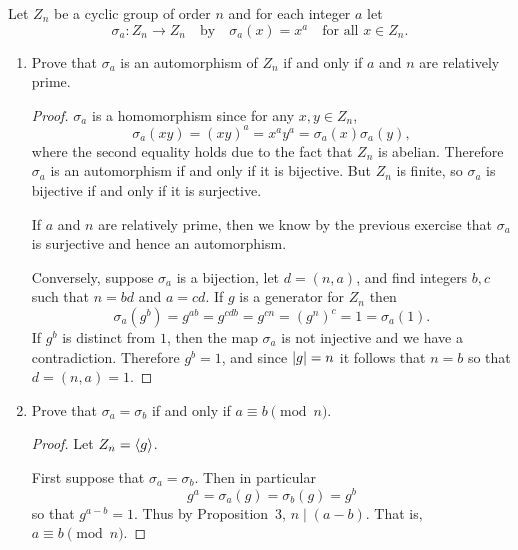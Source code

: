  Let $Z_n$ be a cyclic group of order $n$ and for each
integer $a$ let
\begin{equation*}
  \sigma_a\colon Z_n\to Z_n
  \quad\text{by}\quad
  \sigma_a(x) = x^a \quad\text{for all $x\in Z_n$}.
\end{equation*}
\begin{enumerate}
\item Prove that $\sigma_a$ is an automorphism of $Z_n$ if and only if
  $a$ and $n$ are relatively prime.
  \begin{proof}
    $\sigma_a$ is a homomorphism since for any $x,y\in Z_n$,
    \begin{equation*}
      \sigma_a(xy) = (xy)^a = x^ay^a = \sigma_a(x)\sigma_a(y),
    \end{equation*}
    where the second equality holds due to the fact that $Z_n$ is
    abelian. Therefore $\sigma_a$ is an automorphism if and only if it
    is bijective. But $Z_n$ is finite, so $\sigma_a$ is bijective if
    and only if it is surjective.

    If $a$ and $n$ are relatively prime, then we know by the previous
    exercise that $\sigma_a$ is surjective and hence an automorphism.

    Conversely, suppose $\sigma_a$ is a bijection, let $d = (n,a)$,
    and find integers $b,c$ such that $n = bd$ and $a = cd$. If $g$ is
    a generator for $Z_n$ then
    \begin{equation*}
      \sigma_a(g^b) = g^{ab} = g^{cdb} = g^{cn} = (g^n)^c = 1 = \sigma_a(1).
    \end{equation*}
    If $g^b$ is distinct from $1$, then the map $\sigma_a$ is not
    injective and we have a contradiction. Therefore $g^b = 1$, and
    since $\lvert{g}\rvert = n$ it follows that $n = b$ so that
    $d = (n,a) = 1$.
  \end{proof}
\item Prove that $\sigma_a = \sigma_b$ if and only if
  $a\equiv b\pmod n$.
  \begin{proof}
    Let $Z_n = \langle{g}\rangle$.

    First suppose that $\sigma_a = \sigma_b$. Then in particular
    \begin{equation*}
      g^a = \sigma_a(g) = \sigma_b(g) = g^b
    \end{equation*}
    so that $g^{a-b} = 1$. Thus by Proposition~3, $n\mid(a-b)$. That
    is, $a\equiv b\pmod{n}$.


\end{proof}
\end{enumerate}
